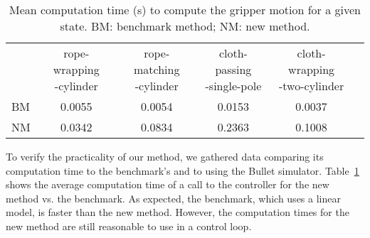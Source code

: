 \begin{table}[t]
\centering
\caption{Mean computation time (s) to compute the gripper motion for a given state. BM: benchmark method; NM: new method.}
\begin{tabular}{lccccc}
\hline
        & \makecell{rope-wrapping\\-cylinder} 
        & \makecell{rope-matching\\-cylinder}
        & \makecell{cloth-passing\\-single-pole}
        & \makecell{cloth-wrapping\\-two-cylinder} \\
BM      & 0.0055   & 0.0054  & 0.0153  & 0.0037   \\ \hline
NM      & 0.0342   & 0.0834  & 0.2363  & 0.1008   \\ \hline
\end{tabular}
\label{tbl:constraint_controller_time_report}
\end{table}

To verify the practicality of our method, we gathered data comparing its computation time to the benchmark's and to using the Bullet simulator. Table~\ref{tbl:constraint_controller_time_report} shows the average computation time of a call to the controller for the new method vs. the benchmark. As expected, the benchmark, which uses a linear model, is faster than the new method. However, the computation times for the new method are still reasonable to use in a control loop.
